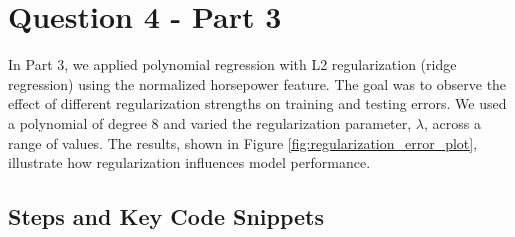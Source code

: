 \documentclass{article}
\begin{document}
	
	
	\section*{Question 4 - Part 3}
	
	In Part 3, we applied polynomial regression with L2 regularization (ridge regression) using the normalized horsepower feature. The goal was to observe the effect of different regularization strengths on training and testing errors. We used a polynomial of degree 8 and varied the regularization parameter, $\lambda$, across a range of values. The results, shown in Figure \ref{fig:regularization_error_plot}, illustrate how regularization influences model performance.
	
	\subsection*{Steps and Key Code Snippets}
	
\end{document}
